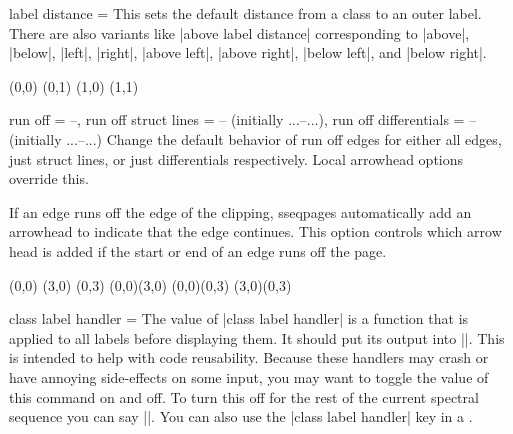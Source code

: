 \begin{sseqdata}[|| name = ex1, cohomological Serre grading]
\begin{keylist}{label distance = }
This sets the default distance from a class to an outer label. There are also variants like |above label distance| corresponding to |above|, |below|, |left|, |right|, |above left|, |above right|, |below left|, and |below right|.
\begin{codeexample}[width = 6cm]
\begin{sseqpage}[ label distance = 0.3em,
                  right label distance = 0em,
                  no axes,yscale = 1.25 ]
\class["a" above](0,0)
(0,1)
\class["c" right](1,0)
\class["c" {right = 1em}](1,1)
\end{sseqpage}
\end{codeexample}
\end{keylist}

\begin{keylist}{run off = --,
    run off struct lines = --  (initially {...--...}),
    run off differentials = -- (initially {...--...})}
Change the default behavior of run off edges for either all edges, just struct lines, or just differentials respectively. Local arrowhead options override this.

If an edge runs off the edge of the clipping, sseqpages automatically add an arrowhead to indicate that the edge continues. This option controls which arrow head is added if the start or end of an edge runs off the page.
\begin{codeexample}[width = 6cm]
\begin{sseqpage}[ x range = {0}{2}, y range = {0}{2},
                  draw orphan edges, run off = >-stealth ]
\class(0,0)
\class(3,0) \class(0,3)
\structline(0,0)(3,0)
\structline[red](0,0)(0,3)
\structline[blue](3,0)(0,3)
\end{sseqpage}
\end{codeexample}
\end{keylist}

\begin{key}{class label handler = }
The value of |class label handler| is a function that is applied to all labels before displaying them. It should put its output into |\processedlabel|.
This is intended to help with code reusability. Because these handlers may crash or have annoying side-effects on some input, you may want to toggle the value of this command on and off. To turn this off for the rest of the current spectral sequence you can say ||. You can also use the |class label handler| key in a \scopeenv.


\end{key}
\end{sseqdata}
